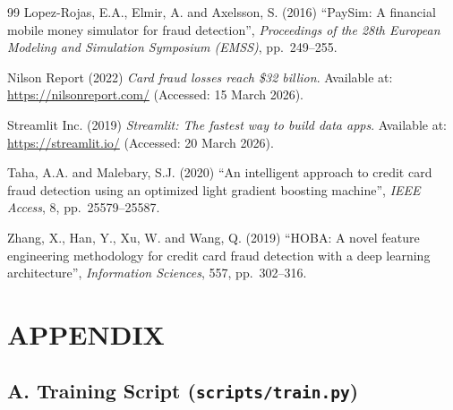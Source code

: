 \documentclass[12pt,a4paper]{report}
\begin{document}
\begin{thebibliography}{99}
Lopez-Rojas, E.A., Elmir, A. and Axelsson, S. (2016) ``PaySim: A financial mobile money simulator for fraud detection'', \textit{Proceedings of the 28th European Modeling and Simulation Symposium (EMSS)}, pp.~249--255.

Nilson Report (2022) \textit{Card fraud losses reach \$32 billion}. Available at: \url{https://nilsonreport.com/} (Accessed: 15 March 2026).

Streamlit Inc. (2019) \textit{Streamlit: The fastest way to build data apps}. Available at: \url{https://streamlit.io/} (Accessed: 20 March 2026).

Taha, A.A. and Malebary, S.J. (2020) ``An intelligent approach to credit card fraud detection using an optimized light gradient boosting machine'', \textit{IEEE Access}, 8, pp.~25579--25587.

Zhang, X., Han, Y., Xu, W. and Wang, Q. (2019) ``HOBA: A novel feature engineering methodology for credit card fraud detection with a deep learning architecture'', \textit{Information Sciences}, 557, pp.~302--316.

\end{thebibliography}

\clearpage
\appendix
{}
\chapter*{APPENDIX}

\section*{A. Training Script (\texttt{scripts/train.py})}
\end{document}
